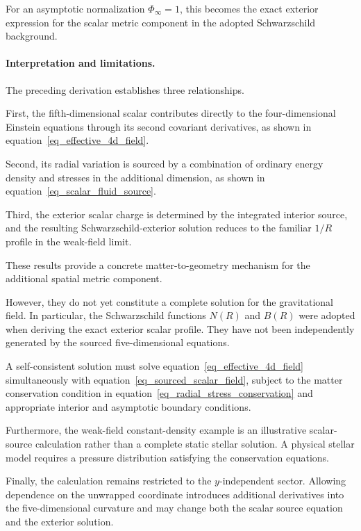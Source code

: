 \documentclass[pdflatex,sn-mathphys-num]{sn-jnl}%
\theoremstyle{thmstyleone}%
\theoremstyle{thmstyletwo}%
\theoremstyle{thmstylethree}%
\begin{document}
For an asymptotic normalization $\Phi_\infty=1$, this becomes the exact exterior expression for the scalar metric component in the adopted Schwarzschild background.

\paragraph{Interpretation and limitations.}

The preceding derivation establishes three relationships.

First, the fifth-dimensional scalar contributes directly to the four-dimensional Einstein equations through its second covariant derivatives, as shown in equation~\eqref{eq_effective_4d_field}.

Second, its radial variation is sourced by a combination of ordinary energy density and stresses in the additional dimension, as shown in equation~\eqref{eq_scalar_fluid_source}.

Third, the exterior scalar charge is determined by the integrated interior source, and the resulting Schwarzschild-exterior solution reduces to the familiar $1/R$ profile in the weak-field limit.

These results provide a concrete matter-to-geometry mechanism for the additional spatial metric component.

However, they do not yet constitute a complete solution for the gravitational field. In particular, the Schwarzschild functions $N(R)$ and $B(R)$ were adopted when deriving the exact exterior scalar profile. They have not been independently generated by the sourced five-dimensional equations.

A self-consistent solution must solve equation~\eqref{eq_effective_4d_field} simultaneously with equation~\eqref{eq_sourced_scalar_field}, subject to the matter conservation condition in equation~\eqref{eq_radial_stress_conservation} and appropriate interior and asymptotic boundary conditions.

Furthermore, the weak-field constant-density example is an illustrative scalar-source calculation rather than a complete static stellar solution. A physical stellar model requires a pressure distribution satisfying the conservation equations.

Finally, the calculation remains restricted to the $y$-independent sector. Allowing dependence on the unwrapped coordinate introduces additional derivatives into the five-dimensional curvature and may change both the scalar source equation and the exterior solution.
\end{document}
